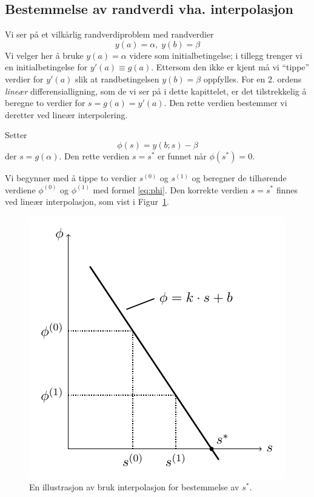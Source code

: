 \subsection{Bestemmelse av randverdi vha. interpolasjon} %
\label{sub:bestemme_}
Vi ser på et vilkårlig randverdiproblem med randverdier
\begin{equation}
  y(a) = \alpha, \; y(b) = \beta
\end{equation}
Vi velger her å bruke $y(a)=\alpha$ videre som initialbetingelse; i tillegg trenger vi en initialbetingelse for $y'(a)\equiv g(a)$. Ettersom den ikke er kjent må vi ``tippe'' verdier for $y'(a)$ slik at randbetingelsen $y(b)=\beta$ oppfylles. For en 2. ordens \emph{lineær} differensialligning, som de vi ser på i dette kapittelet, er det tilstrekkelig å beregne to verdier for $s=g(a)=y'(a)$. Den rette verdien bestemmer vi deretter ved lineær interpolering.

Setter
\begin{equation}
  \phi(s) = y(b;s) - \beta \label{eq:phi}
\end{equation}
der $s=g(\alpha)$. Den rette verdien $s=s^*$ er funnet når $\phi(s^*)=0$.

Vi begynner med å tippe to verdier $s^{(0)}$ og $s^{(1)}$ og beregner de tilhørende verdiene $\phi^{(0)}$ og $\phi^{(1)}$ med formel \eqref{eq:phi}. Den korrekte verdien $s=s^*$ finnes ved lineær interpolasjon, som vist i Figur~\ref{fig:interpolasjon}.

\begin{figure}[htbp]
  \centering
  \includegraphics[]{illustrasjoner/interpolation.pdf}
  \caption{En illustrasjon av bruk interpolasjon for bestemmelse av $s^*$.}
  \label{fig:interpolasjon}
\end{figure}

